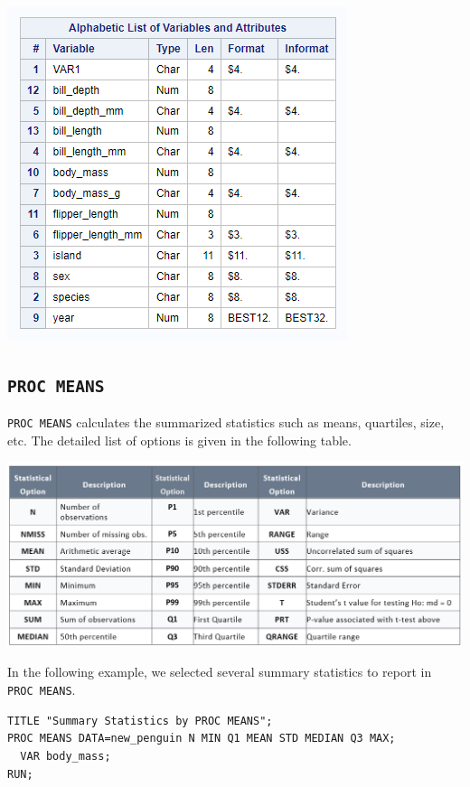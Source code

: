 \documentclass[
]{book}
\begin{document}
\begin{center}\includegraphics[width=0.7\linewidth]{img05/w05-ConvertedDataSet} \end{center}

\hypertarget{proc-means}{%
\subsection{\texorpdfstring{\texttt{PROC\ MEANS}}{PROC MEANS}}\label{proc-means}}

\texttt{PROC\ MEANS} calculates the summarized statistics such as means, quartiles, size, etc. The detailed list of options is given in the following table.

\begin{center}\includegraphics[width=1\linewidth]{img05/w05-ProcMeansOptions} \end{center}

In the following example, we selected several summary statistics to report in \texttt{PROC\ MEANS}.

\begin{verbatim}
TITLE "Summary Statistics by PROC MEANS";
PROC MEANS DATA=new_penguin N MIN Q1 MEAN STD MEDIAN Q3 MAX;
  VAR body_mass;
RUN;
\end{verbatim}
\end{document}
